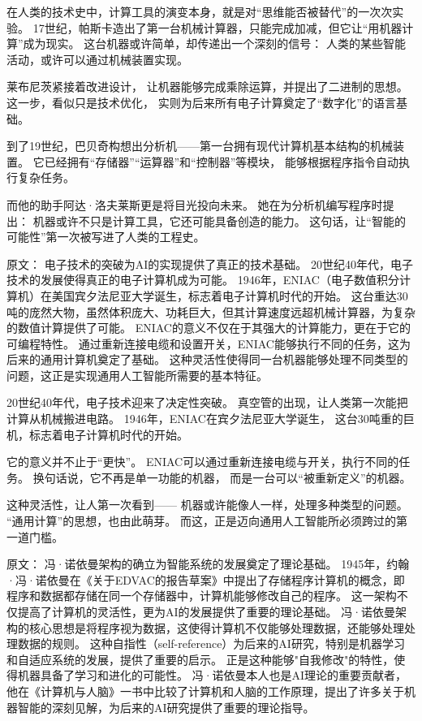 在人类的技术史中，计算工具的演变本身，就是对“思维能否被替代”的一次次实验。
17世纪，帕斯卡造出了第一台机械计算器，只能完成加减，但它让“用机器计算”成为现实。
这台机器或许简单，却传递出一个深刻的信号：
人类的某些智能活动，或许可以通过机械装置实现。

莱布尼茨紧接着改进设计，
让机器能够完成乘除运算，并提出了二进制的思想。
这一步，看似只是技术优化，
实则为后来所有电子计算奠定了“数字化”的语言基础。

到了19世纪，巴贝奇构想出分析机——第一台拥有现代计算机基本结构的机械装置。
它已经拥有“存储器”“运算器”和“控制器”等模块，
能够根据程序指令自动执行复杂任务。

而他的助手阿达·洛夫莱斯更是将目光投向未来。
她在为分析机编写程序时提出：
机器或许不只是计算工具，它还可能具备创造的能力。
这句话，让“智能的可能性”第一次被写进了人类的工程史。

原文：
电子技术的突破为AI的实现提供了真正的技术基础。
20世纪40年代，电子技术的发展使得真正的电子计算机成为可能。
1946年，ENIAC（电子数值积分计算机）在美国宾夕法尼亚大学诞生，标志着电子计算机时代的开始。
这台重达30吨的庞然大物，虽然体积庞大、功耗巨大，但其计算速度远超机械计算器，为复杂的数值计算提供了可能。
ENIAC的意义不仅在于其强大的计算能力，更在于它的可编程特性。
通过重新连接电缆和设置开关，ENIAC能够执行不同的任务，这为后来的通用计算机奠定了基础。
这种灵活性使得同一台机器能够处理不同类型的问题，这正是实现通用人工智能所需要的基本特征。

20世纪40年代，电子技术迎来了决定性突破。
真空管的出现，让人类第一次能把计算从机械搬进电路。
1946年，ENIAC在宾夕法尼亚大学诞生，
这台30吨重的巨机，标志着电子计算机时代的开始。

它的意义并不止于“更快”。
ENIAC可以通过重新连接电缆与开关，执行不同的任务。
换句话说，它不再是单一功能的机器，
而是一台可以“被重新定义”的机器。

这种灵活性，让人第一次看到——
机器或许能像人一样，处理多种类型的问题。
“通用计算”的思想，也由此萌芽。
而这，正是迈向通用人工智能所必须跨过的第一道门槛。

原文：
冯·诺依曼架构的确立为智能系统的发展奠定了理论基础。
1945年，约翰·冯·诺依曼在《关于EDVAC的报告草案》中提出了存储程序计算机的概念，即程序和数据都存储在同一个存储器中，计算机能够修改自己的程序。
这一架构不仅提高了计算机的灵活性，更为AI的发展提供了重要的理论基础。
冯·诺依曼架构的核心思想是将程序视为数据，这使得计算机不仅能够处理数据，还能够处理处理数据的规则。
这种自指性（self-reference）为后来的AI研究，特别是机器学习和自适应系统的发展，提供了重要的启示。
正是这种能够"自我修改"的特性，使得机器具备了学习和进化的可能性。
冯·诺依曼本人也是AI理论的重要贡献者，他在《计算机与人脑》一书中比较了计算机和人脑的工作原理，提出了许多关于机器智能的深刻见解，为后来的AI研究提供了重要的理论指导。

